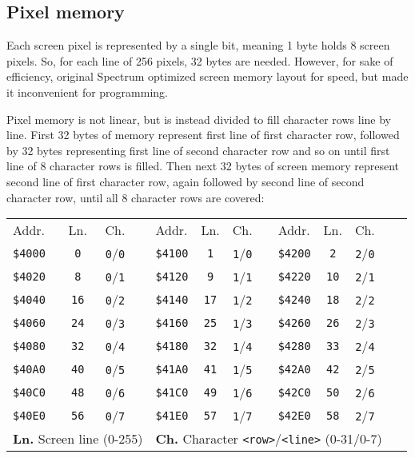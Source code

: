 \documentclass[12pt,twoside,openright,a4paper]{book}
\newcommand{\ddd}{\makebox[1em][c]{.\hfil.\hfil.}}
\begin{document}
\subsection{Pixel memory}

Each screen pixel is represented by a single bit, meaning 1 byte holds 8 screen pixels. So, for each line of 256 pixels, 32 bytes are needed. However, for sake of efficiency, original Spectrum optimized screen memory layout for speed, but made it inconvenient for programming.

Pixel memory is not linear, but is instead divided to fill character rows line by line. First 32 bytes of memory represent first line of first character row, followed by 32 bytes representing first line of second character row and so on until first line of 8 character rows is filled. Then next 32 bytes of screen memory represent second line of first character row, again followed by second line of second character row, until all 8 character rows are covered:

{
	\newcommand{\PixelTitle}{Addr. & Ln. & Ch.}
	\newcommand{\PixelData}[4]{{\tt \$#1} & {\tt #2} & {\tt #3}/{\tt #4}}

	\begin{tabularx}{0.9\linewidth}{lccXlccXlcccX}
		\addtolength{\tabcolsep}{-2pt}
		\PixelTitle & & \PixelTitle & & \PixelTitle & & \\
		\PixelData{4000}{0}{0}{0} & & \PixelData{4100}{1}{1}{0} & & \PixelData{4200}{2}{2}{0} & & \multirow{8}{*}{\ddd} \\
		\PixelData{4020}{8}{0}{1} & & \PixelData{4120}{9}{1}{1} & & \PixelData{4220}{10}{2}{1} & & \\
		\PixelData{4040}{16}{0}{2} & & \PixelData{4140}{17}{1}{2} & & \PixelData{4240}{18}{2}{2} & & \\
		\PixelData{4060}{24}{0}{3} & & \PixelData{4160}{25}{1}{3} & & \PixelData{4260}{26}{2}{3} & & \\
		\PixelData{4080}{32}{0}{4} & & \PixelData{4180}{32}{1}{4} & & \PixelData{4280}{33}{2}{4} & & \\
		\PixelData{40A0}{40}{0}{5} & & \PixelData{41A0}{41}{1}{5} & & \PixelData{42A0}{42}{2}{5} & & \\
		\PixelData{40C0}{48}{0}{6} & & \PixelData{41C0}{49}{1}{6} & & \PixelData{42C0}{50}{2}{6} & & \\
		\PixelData{40E0}{56}{0}{7} & & \PixelData{41E0}{57}{1}{7} & & \PixelData{42E0}{58}{2}{7} & & \\[1ex]
		\multicolumn{4}{l}{\textbf{Ln.} Screen line (0-255)} & \multicolumn{9}{l}{\textbf{Ch.} Character {\tt <row>}/{\tt <line>} (0-31/0-7)} \\
	\end{tabularx}
}
\end{document}
